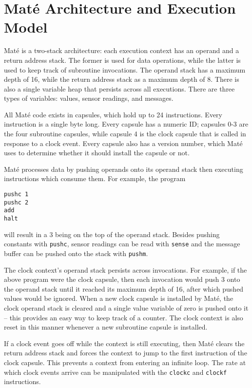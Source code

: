 \documentclass[10pt]{article}
\def\Mate{{Mat\'{e} }}
\def\mate{{Mat\'{e}}}
\begin{document}
\section*{\Mate Architecture and Execution Model}

\Mate is a two-stack architecture: each execution context has an
operand and a return address stack. The former is used for data
operations, while the latter is used to keep track of subroutine
invocations. The operand stack has a maximum depth of 16, while the
return address stack as a maximum depth of 8. There is also a single
variable heap that persists across all executions. There are three
types of variables: values, sensor readings, and messages.

All \Mate code exists in capsules, which hold up to 24
instructions. Every instruction is a single byte long. Every capsule
has a numeric ID; capsules 0-3 are the four subroutine capsules, while
capsule 4 is the clock capsule that is called in response to a clock
event. Every capsule also has a version number, which \Mate uses to
determine whether it should install the capsule or not.

\Mate processes data by pushing operands onto its operand stack then
executing instructions which consume them. For example, the program

\begin{verbatim}
pushc 1
pushc 2
add
halt
\end{verbatim}

will result in a 3 being on the top of the operand stack. Besides
pushing constants with {\tt pushc}, sensor readings can be read with
{\tt sense} and the message buffer can be pushed onto the stack with
{\tt pushm}.

The clock context's operand stack persists across invocations. For
example, if the above program were the clock capsule, then each
invocation would push 3 onto the operand stack until it reached its
maximum depth of 16, after which pushed values would be ignored. When
a new clock capsule is installed by \mate, the clock operand stack is
cleared and a single value variable of zero is pushed onto it -- this
provides an easy way to keep track of a counter. The clock context is
also reset in this manner whenever a new subroutine capsule is
installed.

If a clock event goes off while the context is still executing, then
\Mate clears the return address stack and forces the context to jump
to the first instruction of the clock capsule. This prevents a context
from entering an infinite loop. The rate at which clock events arrive
can be manipulated with the {\tt clockc} and {\tt clockf}
instructions.
\end{document}
